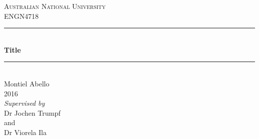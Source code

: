 \begin{titlepage}
\maketitle
\thispagestyle{empty}
\newcommand{\HRule}{\rule{\linewidth}{0.5mm}} %

\center %
 
\textsc{\LARGE Australian National University}\\[1.5cm] %
\textsc{\Large ENGN4718}\\[0.5cm] %
\HRule \\[0.4cm]
{ \huge \bfseries Title}\\[0.4cm] %
\HRule \\[1.5cm]
 
Montiel Abello\\
2016\\
\vspace{20em}
\textit{Supervised by}\\
Dr Jochen Trumpf\\ and \\ Dr Viorela Ila


\vfill %

\end{titlepage}